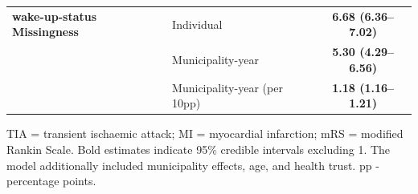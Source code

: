 \begin{table}[htbp]
\begin{threeparttable}
\begin{tabularx}{\textwidth}{@{}XXc@{}}
      \addlinespace
      \textbf{wake-up-status Missingness}
       & Individual               & \textbf{6.68 (6.36--7.02)} \\

       & Municipality-year        & \textbf{5.30 (4.29--6.56)} \\
       & Municipality-year 
          (per 10pp)              & \textbf{1.18 (1.16--1.21)} \\

      \bottomrule
    \end{tabularx}

    \begin{tablenotes}
      \footnotesize
      \item TIA = transient ischaemic attack; MI = myocardial infarction; mRS = modified
      Rankin Scale. Bold estimates indicate 95\% credible intervals excluding 1. The
      model additionally included municipality effects, age, and health trust. pp - percentage points. 
    \end{tablenotes}

  \end{threeparttable}
\end{table}